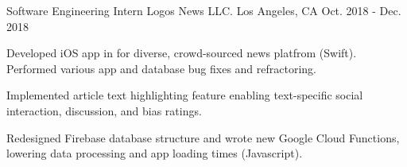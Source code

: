 \begin{cventries}
  \cventry
    {Software Engineering Intern} %
    {Logos News LLC.} %
    {Los Angeles, CA} %
    {Oct. 2018 - Dec. 2018} %
    {
      \begin{cvitems} %
        \item {Developed iOS app in for diverse, crowd-sourced news platfrom (Swift). Performed various app and database bug fixes and refractoring.
        \item Implemented article text highlighting feature enabling text-specific social interaction, discussion, and bias ratings.}
        \item Redesigned Firebase database structure and wrote new Google Cloud Functions, lowering data processing and app loading times (Javascript).
      \end{cvitems}
    }

\end{cventries}
